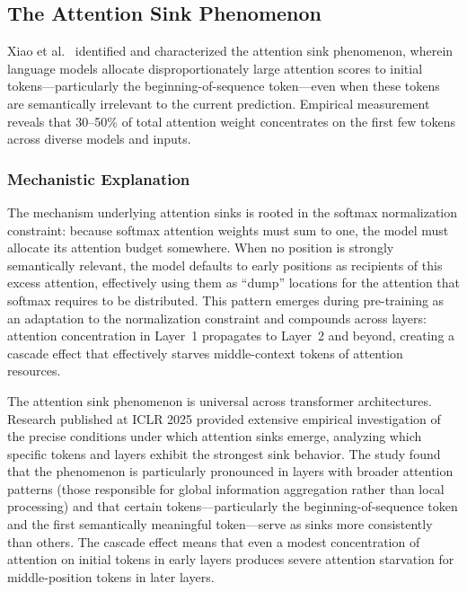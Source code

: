 \documentclass[11pt,letterpaper]{article}
\begin{document}
\subsection{The Attention Sink Phenomenon}

Xiao et al.\ \cite{xiao2024efficient} identified and characterized the attention sink phenomenon, wherein language models allocate disproportionately large attention scores to initial tokens---particularly the beginning-of-sequence token---even when these tokens are semantically irrelevant to the current prediction. Empirical measurement reveals that 30--50\% of total attention weight concentrates on the first few tokens across diverse models and inputs.

\subsubsection{Mechanistic Explanation}

The mechanism underlying attention sinks is rooted in the softmax normalization constraint: because softmax attention weights must sum to one, the model must allocate its attention budget somewhere. When no position is strongly semantically relevant, the model defaults to early positions as recipients of this excess attention, effectively using them as ``dump'' locations for the attention that softmax requires to be distributed. This pattern emerges during pre-training as an adaptation to the normalization constraint and compounds across layers: attention concentration in Layer~1 propagates to Layer~2 and beyond, creating a cascade effect that effectively starves middle-context tokens of attention resources.

The attention sink phenomenon is universal across transformer architectures. Research published at ICLR 2025 provided extensive empirical investigation of the precise conditions under which attention sinks emerge, analyzing which specific tokens and layers exhibit the strongest sink behavior. The study found that the phenomenon is particularly pronounced in layers with broader attention patterns (those responsible for global information aggregation rather than local processing) and that certain tokens---particularly the beginning-of-sequence token and the first semantically meaningful token---serve as sinks more consistently than others. The cascade effect means that even a modest concentration of attention on initial tokens in early layers produces severe attention starvation for middle-position tokens in later layers.
\end{document}
